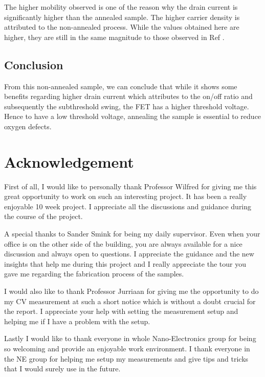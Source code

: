 \documentclass[11pt,a4paper]{report}
\begin{document}
The higher mobility observed is one of the reason why the drain current is significantly higher than the annealed sample. The higher carrier density is attributed to the non-annealed process. While the values obtained here are higher, they are still in the same magnitude to those observed in Ref \cite{thiel_2006,caviglia}.

\section{Conclusion}
From this non-annealed sample, we can conclude that while it shows some benefits regarding higher drain current which attributes to the on/off ratio and subsequently the subthreshold swing, the FET has a higher threshold voltage. Hence to have a low threshold voltage, annealing the sample is essential to reduce oxygen defects.


\chapter*{Acknowledgement}
First of all, I would like to personally thank Professor Wilfred for giving me this great opportunity to work on such an interesting project. It has been a really enjoyable 10 week project. I appreciate all the discussions and guidance during the course of the project.

A special thanks to Sander Smink for being my daily supervisor. Even when your office is on the other side of the building, you are always available for a nice discussion and always open to questions. I appreciate the guidance and the new insights that help me during this project and I really appreciate the tour you gave me regarding the fabrication process of the samples.

I would also like to thank Professor Jurriaan for giving me the opportunity to do my CV measurement at such a short notice which is without a doubt crucial for the report. I appreciate your help with setting the measurement setup and helping me if I have a problem with the setup.

Lastly I would like to thank everyone in whole Nano-Electronics group for being so welcoming and provide an enjoyable work environment. I thank everyone in the NE group for helping me setup my measurements and give tips and tricks that I would surely use in the future.


\nocite{*}
\printbibliography
\end{document}
